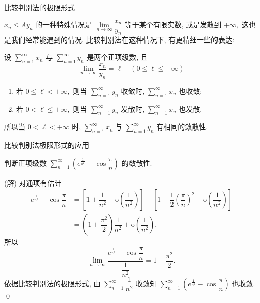 \begin{frame}{比较判别法的极限形式}

$x_n \leqslant Ay_n$ 的一种特殊情况是 $\lim\limits_{n\to\infty} \dfrac{x_n}{y_n}$ 等于某个有限实数, 或是发散到 $+\infty,$ 这也是我们经常能遇到的情况. 比较判别法在这种情况下, 有更精细一些的表达:

\pause

\begin{thm}[比较判别法的极限形式]
设 $\sum\limits_{n=1}^\infty x_n$ 与 $\sum\limits_{n=1}^\infty y_n$ 是两个正项级数, 且
\vspace*{-0.9em}
\[\lim\limits_{n\to\infty} \dfrac{x_n}{y_n} = \ell \quad (0 \leqslant \ell \leqslant +\infty)\]
\vspace*{-1.3em}
\begin{enumerate}
\item[(1)] 若 $0 \leqslant \ell < +\infty,$ 则当 $\sum\limits_{n=1}^\infty y_n$ 收敛时, $\sum\limits_{n=1}^\infty x_n$ 也收敛;
\item[(2)] 若 $0 < \ell \leqslant +\infty,$ 则当 $\sum\limits_{n=1}^\infty y_n$ 发散时, $\sum\limits_{n=1}^\infty x_n$ 也发散.
\end{enumerate}
所以当 $0 < \ell < +\infty$ 时, $\sum\limits_{n=1}^\infty x_n$ 与 $\sum\limits_{n=1}^\infty y_n$ 有相同的敛散性.
\end{thm}

\end{frame}


\begin{frame}{比较判别法极限形式的应用}

\begin{eg}
\begin{center}
判断正项级数 $\sum\limits_{n=1}^\infty \left( e^{\frac{1}{n^2}} - \cos\dfrac{\pi}{n} \right)$ 的敛散性.
\end{center}
\end{eg}

\pause

\startproof[bg=yellow, fg=red](解)
对通项有估计
\begin{align*}
e^{\frac{1}{n^2}} - \cos\dfrac{\pi}{n} & = \left[ 1 + \dfrac{1}{n^2} + \mathrm{o}\left(\dfrac{1}{n^2}\right) \right] - \left[ 1 - \dfrac{1}{2} \left(\dfrac{\pi}{n}\right)^2 + \mathrm{o}\left(\dfrac{1}{n^2}\right) \right] \\
& = \left( 1 + \dfrac{\pi^2}{2} \right) \dfrac{1}{n^2} + \mathrm{o}\left(\dfrac{1}{n^2}\right),
\end{align*}
\pause
所以
\vspace*{-1.6em}
\[\lim\limits_{n\to\infty} \dfrac{e^{\frac{1}{n^2}} - \cos\dfrac{\pi}{n}}{\dfrac{1}{n^2}} = 1 + \dfrac{\pi^2}{2}.\]
依据比较判别法的极限形式, 由 $\sum\limits_{n=1}^\infty \dfrac{1}{n^2}$ 收敛知 $\sum\limits_{n=1}^\infty \left( e^{\frac{1}{n^2}} - \cos\dfrac{\pi}{n} \right)$ 也收敛.
\qed

\end{frame}

